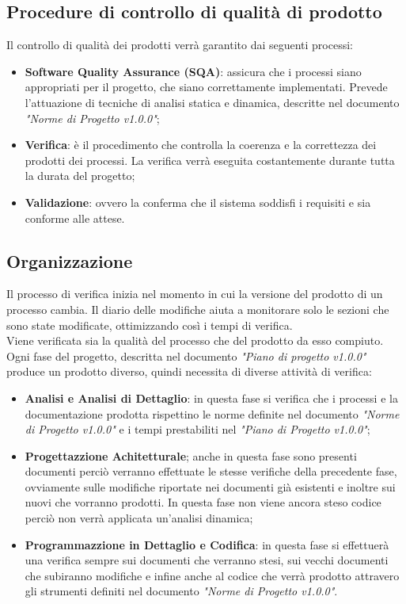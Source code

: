 \documentclass[12pt,a4paper,titlepage]{article}
\begin{document}
	\subsection{Procedure di controllo di qualità di prodotto}
	Il controllo di qualità dei prodotti verrà garantito dai seguenti processi:
	\begin{itemize}
		\item \textbf{Software Quality Assurance (SQA)}: assicura che i processi siano appropriati per il progetto, che siano correttamente implementati. Prevede l'attuazione di tecniche di analisi statica e dinamica, descritte nel documento \textit{"Norme di Progetto v1.0.0"};
		\item \textbf{Verifica}: è il procedimento che controlla la coerenza e la correttezza dei prodotti dei processi. La verifica verrà eseguita costantemente durante tutta la durata del progetto;
		\item \textbf{Validazione}: ovvero la conferma che il sistema soddisfi i requisiti e sia conforme alle attese.
	\end{itemize}

	\subsection{Organizzazione}
	Il processo di verifica inizia nel momento in cui la versione del prodotto di un processo cambia. Il diario delle modifiche aiuta a monitorare solo le sezioni che sono state modificate, ottimizzando così i tempi di verifica.\\
	Viene verificata sia la qualità del processo che del prodotto da esso compiuto.\\
	Ogni fase del progetto, descritta nel documento \textit{"Piano di progetto v1.0.0"} produce un prodotto diverso, quindi necessita di diverse attività di verifica:
	\begin{itemize}
		\item \textbf{Analisi e Analisi di Dettaglio}: in questa fase si verifica che i processi e la documentazione prodotta rispettino le norme definite nel documento \textit{"Norme di Progetto v1.0.0"} e i tempi prestabiliti nel \textit{"Piano di Progetto v1.0.0"};
	    \item \textbf{Progettazzione Achitetturale}; anche in questa fase sono presenti documenti perciò verranno effettuate le stesse verifiche della precedente fase, ovviamente sulle modifiche riportate nei documenti già esistenti e inoltre sui nuovi che vorranno prodotti. In questa fase non viene ancora steso codice perciò non verrà applicata un'analisi dinamica;
	    \item \textbf{Programmazzione in Dettaglio e Codifica}: in questa fase si effettuerà una verifica sempre sui documenti che verranno stesi, sui vecchi documenti che subiranno modifiche e infine anche al codice che verrà prodotto attravero gli strumenti definiti nel documento \textit{"Norme di Progetto v1.0.0"}.
	\end{itemize}
\end{document}
